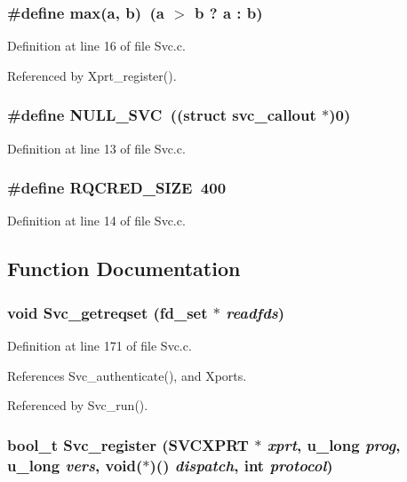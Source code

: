 \subsubsection{\setlength{\rightskip}{0pt plus 5cm}\#define max(a, b)\ (a $>$ b ? a : b)}\label{Svc_8c_a2}




Definition at line 16 of file Svc.c.

Referenced by Xprt\_\-register().
\subsubsection{\setlength{\rightskip}{0pt plus 5cm}\#define NULL\_\-SVC\ ((struct svc\_\-callout $\ast$)0)}\label{Svc_8c_a0}




Definition at line 13 of file Svc.c.
\subsubsection{\setlength{\rightskip}{0pt plus 5cm}\#define RQCRED\_\-SIZE\ 400}\label{Svc_8c_a1}




Definition at line 14 of file Svc.c.

\subsection{Function Documentation}
\subsubsection{\setlength{\rightskip}{0pt plus 5cm}void Svc\_\-getreqset (fd\_\-set $\ast$ {\em readfds})}\label{Svc_8c_a13}




Definition at line 171 of file Svc.c.

References Svc\_\-authenticate(), and Xports.

Referenced by Svc\_\-run().
\subsubsection{\setlength{\rightskip}{0pt plus 5cm}bool\_\-t Svc\_\-register (SVCXPRT $\ast$ {\em xprt}, u\_\-long {\em prog}, u\_\-long {\em vers}, void($\ast$)() {\em dispatch}, int {\em protocol})}\label{Svc_8c_a10}




